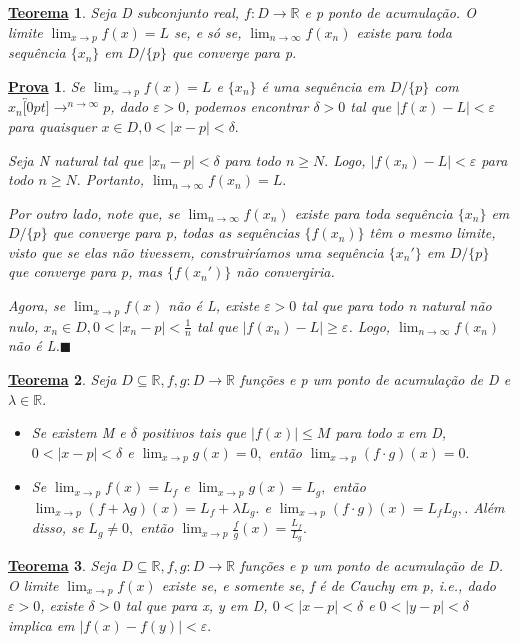 \documentclass{article}
\newtheorem*{theorem*}{\underline{Teorema}}
\newtheorem*{proof*}{\underline{Prova}}
\renewcommand\qedsymbol{$\blacksquare$}
\begin{document}
\begin{theorem*}
  Seja D subconjunto real, $f:D\rightarrow \mathbb{R}$ e p ponto de acumula\c c\~ao. O limite $\lim_{x\to p}f(x)=L$ se, e s\'o se,
  $\lim_{n\to\infty}f(x_{n})$ existe para toda sequ\^encia $\{x_{n}\}$ em $D/\{p\}$ que converge para p.
\end{theorem*}
\begin{proof*}
  Se $\lim_{x\to p }f(x) = L$ e $\{x_{n}\}$ \'e uma sequ\^encia em $D/\{p\}$ com $x_{n}\overbracket[0pt]{\longrightarrow}^{n\to \infty}p$, dado
  $\varepsilon > 0$, podemos encontrar $\delta > 0$ tal que $|f(x)-L|<\varepsilon$ para quaisquer $x\in D, 0<|x-p|<\delta.$

  Seja N natural tal que $|x_{n}-p|<\delta$ para todo $n\geq{N}.$ Logo, $|f(x_{n})-L| < \varepsilon$ para todo $n\geq{N}.$
  Portanto, $\lim_{n\to\infty}f(x_{n})=L.$ 

  Por outro lado, note que, se $\lim_{n\to\infty}f(x_{n})$ existe para toda sequ\^encia $\{x_{n}\}$ em $D/\{p\}$ que converge
  para p, todas as sequ\^encias $\{f(x_{n})\}$ t\^em o mesmo limite, visto que se elas n\~ao tivessem, construir\'iamos uma sequ\^encia
  $\{x_{n}'\}$ em $D/\{p\}$ que converge para p, mas $\{f(x_{n}')\}$ n\~ao convergiria.

  Agora, se $\lim_{x\to p}f(x)$ n\~ao \'e L, existe $\varepsilon > 0$ tal que para todo n natural n\~ao nulo, $x_{n}\in D, 0 <|x_{n}-p|<\frac{1}{n}$ tal 
  que $|f(x_{n})-L|\geq{\varepsilon}$. Logo, $\lim_{n\to\infty}f(x_{n})$ n\~ao \'e L.\qedsymbol
\end{proof*}
\begin{theorem*}
  Seja $D\subseteq{\mathbb{R}}, f, g:D\rightarrow \mathbb{R}$ fun\c c\~oes e p um ponto de acumula\c c\~ao de D e $\lambda\in \mathbb{R}.$
 \begin{itemize}
   \item[i)] Se existem M e $\delta$ positivos tais que $|f(x)|\leq{M}$ para todo x em D, $0 <|x-p|<\delta$ e $\lim_{x\to p}g(x)=0,$
     ent\~ao $\lim_{x\to p}(f \cdot g)(x) = 0.$
     \item[ii)] Se $\lim_{x\to p}f(x) = L_{f}$ e $\lim_{x\to p}g(x) = L_{g},$ ent\~ao $\lim_{x\to p}(f + \lambda g)(x) = L_{f} + \lambda L_{g}.$
     e $\lim_{x\to p}(f \cdot g)(x) = L_{f}L_{g},$. Al\'em disso, se $L_{g}\neq0,$ ent\~ao $\lim_{x\to p}\frac{f}{g}(x) = \frac{L_{f}}{L_{g}}.$
 \end{itemize}
\end{theorem*}
\begin{theorem*}
  Seja $D\subseteq{\mathbb{R}}, f, g:D\rightarrow \mathbb{R}$ fun\c c\~oes e p um ponto de acumula\c c\~ao de D. O limite
  $\lim_{x\to p}f(x)$ existe se, e somente se, f \'e de Cauchy em p, i.e., dado $\varepsilon > 0$, existe $\delta > 0$ tal que
  para x, y em D, $0<|x-p|<\delta$ e $0<|y-p|<\delta$ implica em $|f(x)-f(y)|<\varepsilon.$
\end{theorem*}
\end{document}
